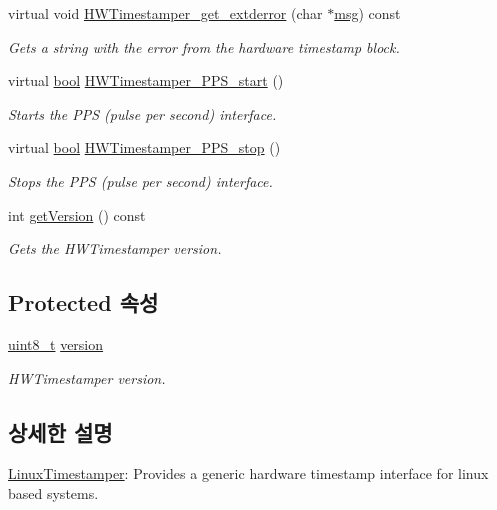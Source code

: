 \begin{DoxyCompactItemize}
virtual void \hyperlink{class_common_timestamper_a3b26113436dec73775d2cbc523a6e074}{H\+W\+Timestamper\+\_\+get\+\_\+extderror} (char $\ast$\hyperlink{openavb__log_8c_a0c7e58a50354c4a4d6dad428d0e47029}{msg}) const 
\begin{DoxyCompactList}\small\item\em Gets a string with the error from the hardware timestamp block. \end{DoxyCompactList}\item 
virtual \hyperlink{avb__gptp_8h_af6a258d8f3ee5206d682d799316314b1}{bool} \hyperlink{class_common_timestamper_a2cbaeb84807ca61af0bc56bcc475468d}{H\+W\+Timestamper\+\_\+\+P\+P\+S\+\_\+start} ()
\begin{DoxyCompactList}\small\item\em Starts the P\+PS (pulse per second) interface. \end{DoxyCompactList}\item 
virtual \hyperlink{avb__gptp_8h_af6a258d8f3ee5206d682d799316314b1}{bool} \hyperlink{class_common_timestamper_ac5d9f1e5eb402dffaa8897367e9fd7d3}{H\+W\+Timestamper\+\_\+\+P\+P\+S\+\_\+stop} ()
\begin{DoxyCompactList}\small\item\em Stops the P\+PS (pulse per second) interface. \end{DoxyCompactList}\item 
int \hyperlink{class_common_timestamper_a4d1414f8d9ed8d83c91769b148106307}{get\+Version} () const 
\begin{DoxyCompactList}\small\item\em Gets the H\+W\+Timestamper version. \end{DoxyCompactList}\end{DoxyCompactItemize}
\subsection*{Protected 속성}
\begin{DoxyCompactItemize}
\item 
\hyperlink{stdint_8h_aba7bc1797add20fe3efdf37ced1182c5}{uint8\+\_\+t} \hyperlink{class_common_timestamper_ab22abc2906422da61885ac6c8e6a1a59}{version}
\begin{DoxyCompactList}\small\item\em H\+W\+Timestamper version. \end{DoxyCompactList}\end{DoxyCompactItemize}


\subsection{상세한 설명}
\hyperlink{class_linux_timestamper}{Linux\+Timestamper}\+: Provides a generic hardware timestamp interface for linux based systems. 


